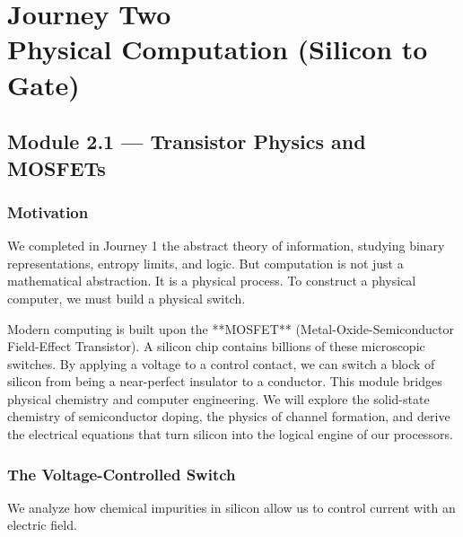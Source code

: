 \documentclass[12pt, a4paper]{book}
\begin{document}
\setcounter{chapter}{1}
\chapter[Journey 2 --- Physical Computation (Silicon to Gate)]
        {Journey Two\\[8pt]
         \textcolor{ModuleColor}{\large Physical Computation (Silicon to Gate)}}
\setcounter{section}{0}

\section{Module 2.1 --- Transistor Physics and MOSFETs}
\label{sec:mod2.1}

\subsection*{Motivation}

We completed in Journey 1 the abstract theory of information, studying binary representations, entropy limits, and logic.
But computation is not just a mathematical abstraction. It is a physical process.
To construct a physical computer, we must build a physical switch.

Modern computing is built upon the **MOSFET** (Metal-Oxide-Semiconductor Field-Effect Transistor).
A silicon chip contains billions of these microscopic switches.
By applying a voltage to a control contact, we can switch a block of silicon from being a near-perfect insulator to a conductor.
This module bridges physical chemistry and computer engineering.
We will explore the solid-state chemistry of semiconductor doping, the physics of channel formation, and derive the electrical equations that turn silicon into the logical engine of our processors.

\subsection{The Voltage-Controlled Switch}

We analyze how chemical impurities in silicon allow us to control current with an electric field.
\end{document}
